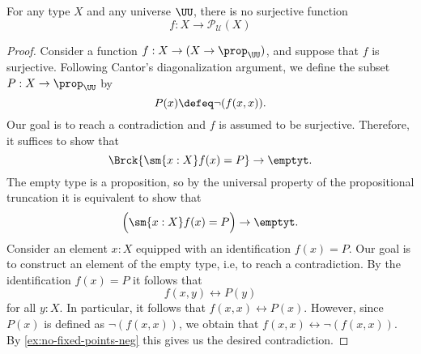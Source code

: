 \begin{thm}
  For any type $X$ and any universe $\UU$, there is no surjective function
  \begin{equation*}
    f : X \to \mathcal{P}_{\mathcal{U}}(X)
  \end{equation*}
\end{thm}

\begin{proof}
  Consider a function $f:X\to (X\to \prop_\UU)$, and suppose that $f$ is surjective. Following Cantor's diagonalization argument, we define the subset $P:X\to\prop_\UU$ by
  \begin{equation*}
    P(x)\defeq \neg(f(x,x)).
  \end{equation*}
  Our goal is to reach a contradiction and $f$ is assumed to be surjective. Therefore, it suffices to show that
  \begin{equation*}
    \Brck{\sm{x:X}f(x)=P}\to\emptyt.
  \end{equation*}
  The empty type is a proposition, so by the universal property of the propositional truncation it is equivalent to show that
  \begin{equation*}
    \Big(\sm{x:X}f(x)=P\Big)\to\emptyt.
  \end{equation*}
  Consider an element $x:X$ equipped with an identification $f(x)=P$. Our goal is to construct an element of the empty type, i.e, to reach a contradiction. By the identification $f(x)=P$ it follows that 
  \begin{equation*}
    f(x,y)\leftrightarrow P(y)
  \end{equation*}
  for all $y:X$. In particular, it follows that $f(x,x)\leftrightarrow P(x)$. However, since $P(x)$ is defined as $\neg(f(x,x))$, we obtain that $f(x,x)\leftrightarrow\neg(f(x,x))$. By \cref{ex:no-fixed-points-neg} this gives us the desired contradiction.
\end{proof}

